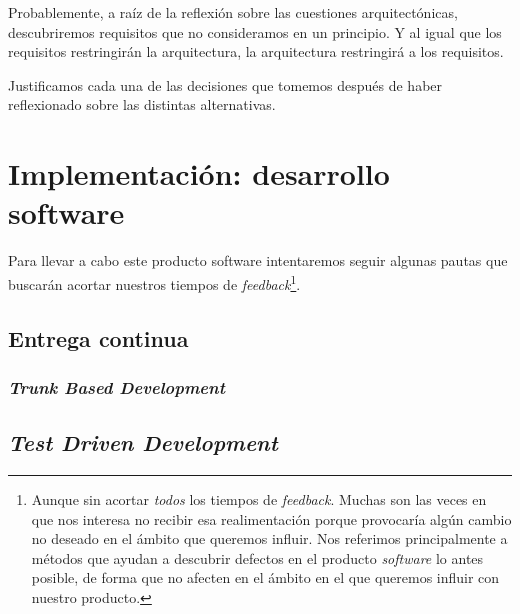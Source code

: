 Probablemente, a raíz de la reflexión sobre las cuestiones arquitectónicas, descubriremos
requisitos que no consideramos en un principio. Y al igual que los requisitos restringirán la arquitectura, la arquitectura
restringirá a los requisitos.

Justificamos cada una de las decisiones que tomemos después de haber reflexionado sobre las
distintas alternativas. 


\section{Implementación: desarrollo software}

Para llevar a cabo este producto software intentaremos seguir algunas
pautas que buscarán acortar nuestros tiempos de \textit{feedback}\footnote{%
    Aunque sin acortar \textit{todos} los tiempos de \textit{feedback}. Muchas son las
    veces en que nos interesa no recibir esa realimentación porque provocaría
    algún cambio no deseado en el ámbito que queremos influir. Nos referimos
    principalmente a métodos que ayudan a descubrir defectos en el producto
    \textit{software} lo antes posible, de forma que no afecten en el ámbito en el que
    queremos influir con nuestro producto.
}.

\subsection{Entrega continua}

\subsubsection{\textit{Trunk Based Development}}

\subsection{\textit{Test Driven Development}}




